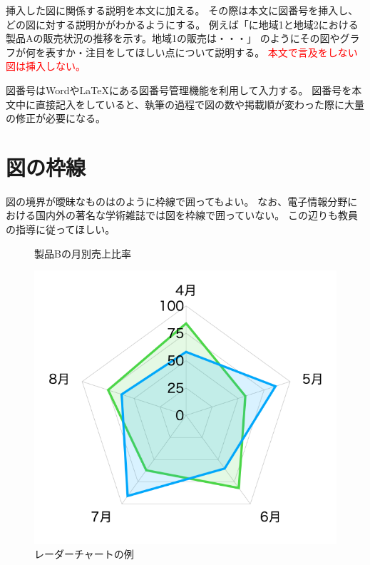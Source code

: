 挿入した図に関係する説明を本文に加える。
その際は本文に図番号を挿入し、どの図に対する説明かがわかるようにする。
例えば「に地域1と地域2における製品Aの販売状況の推移を示す。地域1の販売は・・・」
のようにその図やグラフが何を表すか・注目をしてほしい点について説明する。
\textcolor{red}{本文で言及をしない図は挿入しない。}

図番号はWordや\LaTeX にある図番号管理機能を利用して入力する。
図番号を本文中に直接記入をしていると、執筆の過程で図の数や掲載順が変わった際に大量の修正が必要になる。


\section{図の枠線}

図の境界が曖昧なものはのように枠線で囲ってもよい。
なお、電子情報分野における国内外の著名な学術雑誌では図を枠線で囲っていない。
この辺りも教員の指導に従ってほしい。

\begin{figure}[H]
  \centering
  \caption{製品Bの月別売上比率}
  \label{fig:chart2}
\end{figure}

\begin{figure}[H]
  \centering
  \includegraphics[width=.4\linewidth]{./fig/chart3.png}
  \caption{レーダーチャートの例}
  \label{fig:chart3}
\end{figure}

